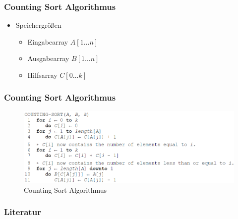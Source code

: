 \documentclass{beamer}
\begin{document}
\begin{frame}
  \frametitle{Counting Sort Algorithmus}
  \begin{itemize}
    \item Speichergrößen
    \begin{itemize}
        \item Eingabearray $A[1\dots n]$
        \item Ausgabearray $B[1\dots n]$
        \item Hilfsarray $C[0\dots k]$
    \end{itemize}
  \end{itemize}
\end{frame}

\begin{frame}
  \frametitle{Counting Sort Algorithmus}
  \begin{figure}[htb]
    \centering
    \includegraphics[width=1.1\textwidth]{img/counting-sort}
    \caption{Counting Sort Algorithmus \cite{CormenLeisersonRivestStein200107}} %
  \end{figure}
\end{frame}

\begin{frame}
  \frametitle{Literatur}

  
  
\end{frame}
\end{document}
